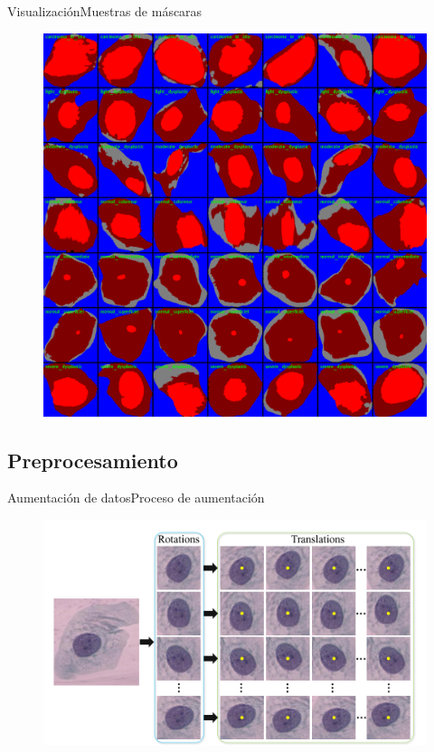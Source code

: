 \documentclass{beamer}
\begin{document}
    \begin{frame}{Visualización}{Muestras de máscaras}
        \begin{figure}[]
            \centering
            \includegraphics[height=0.9\textheight]{muestras_mascaras}
        \end{figure}
    \end{frame}


    \subsection{Preprocesamiento}
    \begin{frame}{Aumentación de datos}{Proceso de aumentación}
        \begin{figure}[]
            \centering
            \includegraphics[width=1\textwidth]{augment}
        \end{figure}
    \end{frame}
\end{document}
